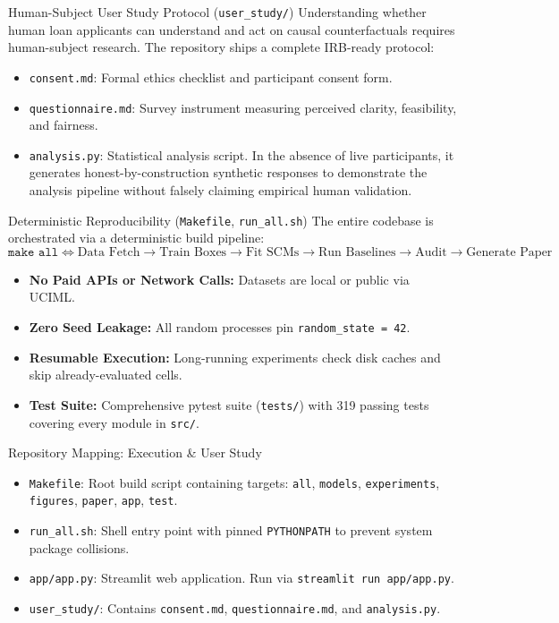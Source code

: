 \documentclass[11pt,a4paper]{article}
\begin{document}
\begin{parentconcept}{Human-Subject User Study Protocol (\texttt{user\_study/})}
Understanding whether human loan applicants can understand and act on causal counterfactuals requires human-subject research. The repository ships a complete IRB-ready protocol:
\begin{itemize}[leftmargin=1.5em]
    \item \texttt{consent.md}: Formal ethics checklist and participant consent form.
    \item \texttt{questionnaire.md}: Survey instrument measuring perceived clarity, feasibility, and fairness.
    \item \texttt{analysis.py}: Statistical analysis script. In the absence of live participants, it generates honest-by-construction synthetic responses to demonstrate the analysis pipeline without falsely claiming empirical human validation.
\end{itemize}
\end{parentconcept}

\begin{parentconcept}{Deterministic Reproducibility (\texttt{Makefile}, \texttt{run\_all.sh})}
The entire codebase is orchestrated via a deterministic build pipeline:
\begin{equation}
\texttt{make all} \iff \text{Data Fetch} \to \text{Train Boxes} \to \text{Fit SCMs} \to \text{Run Baselines} \to \text{Audit} \to \text{Generate Paper}
\end{equation}
\begin{itemize}[leftmargin=1.5em]
    \item \textbf{No Paid APIs or Network Calls:} Datasets are local or public via UCIML.
    \item \textbf{Zero Seed Leakage:} All random processes pin \texttt{random\_state = 42}.
    \item \textbf{Resumable Execution:} Long-running experiments check disk caches and skip already-evaluated cells.
    \item \textbf{Test Suite:} Comprehensive pytest suite (\texttt{tests/}) with 319 passing tests covering every module in \texttt{src/}.
\end{itemize}
\end{parentconcept}

\begin{codeanatomy}{Repository Mapping: Execution \& User Study}
\begin{itemize}[leftmargin=1.2em]
    \item \texttt{Makefile}: Root build script containing targets: \texttt{all}, \texttt{models}, \texttt{experiments}, \texttt{figures}, \texttt{paper}, \texttt{app}, \texttt{test}.
    \item \texttt{run\_all.sh}: Shell entry point with pinned \texttt{PYTHONPATH} to prevent system package collisions.
    \item \texttt{app/app.py}: Streamlit web application. Run via \texttt{streamlit run app/app.py}.
    \item \texttt{user\_study/}: Contains \texttt{consent.md}, \texttt{questionnaire.md}, and \texttt{analysis.py}.
\end{itemize}
\end{codeanatomy}
\end{document}
